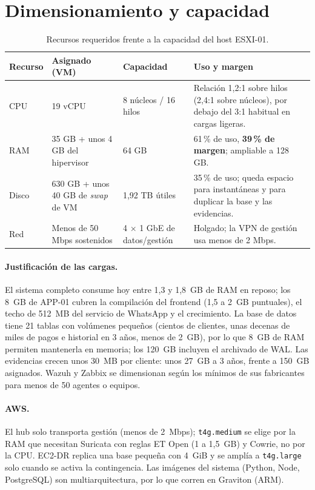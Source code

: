 \section{Dimensionamiento y capacidad}

\begin{table}[H]
\centering
\caption{Recursos requeridos frente a la capacidad del host ESXI-01.}
\label{tab:ce03-capacidad}
\small
\begin{tabularx}{\textwidth}{L{2.4cm}L{2.6cm}L{2.6cm}X}
\toprule
\textbf{Recurso} & \textbf{Asignado (VM)} & \textbf{Capacidad} & \textbf{Uso y margen} \\
\midrule
CPU & 19 vCPU & 8 núcleos / 16 hilos & Relación 1,2:1 sobre hilos (2,4:1 sobre núcleos), por debajo del 3:1 habitual en cargas ligeras. \\
RAM & 35 GB + unos 4 GB del hipervisor & 64 GB & 61\,\% de uso, \textbf{39\,\% de margen}; ampliable a 128 GB. \\
Disco & 630 GB + unos 40 GB de \emph{swap} de VM & 1,92 TB útiles & 35\,\% de uso; queda espacio para instantáneas y para duplicar la base y las evidencias. \\
Red & Menos de 50 Mbps sostenidos & 4 $\times$ 1 GbE de datos/gestión & Holgado; la VPN de gestión usa menos de 2 Mbps. \\
\bottomrule
\end{tabularx}
\end{table}

\paragraph{Justificación de las cargas.} El sistema completo consume hoy entre 1,3 y
1,8~GB de RAM en reposo; los 8~GB de APP-01 cubren la compilación del frontend (1,5 a
2~GB puntuales), el techo de 512~MB del servicio de WhatsApp y el crecimiento. La base
de datos tiene 21 tablas con volúmenes pequeños (cientos de clientes, unas decenas de
miles de pagos e historial en 3 años, menos de 2~GB), por lo que 8~GB de RAM permiten
mantenerla en memoria; los 120~GB incluyen el archivado de WAL. Las evidencias crecen
unos 30~MB por cliente: unos 27~GB a 3 años, frente a 150~GB asignados. Wazuh y
Zabbix se dimensionan según los mínimos de sus fabricantes para menos de 50 agentes o
equipos.

\paragraph{AWS.} El hub solo transporta gestión (menos de 2~Mbps); \texttt{t4g.medium}
se elige por la RAM que necesitan Suricata con reglas ET Open (1 a 1,5~GB) y Cowrie, no
por la CPU. EC2-DR replica una base pequeña con 4~GiB y se amplía a \texttt{t4g.large}
solo cuando se activa la contingencia. Las imágenes del sistema (Python, Node,
PostgreSQL) son multiarquitectura, por lo que corren en Graviton (ARM).


